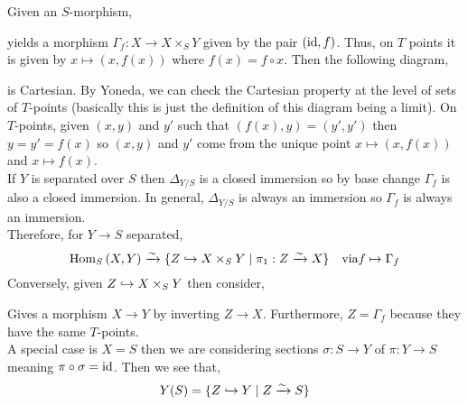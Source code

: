 \documentclass[12pt]{article}
\begin{document}
Given an $S$-morphism,
\begin{center}
\end{center}
yields a morphism $\Gamma_f : X \to X \times_S Y$ given by the pair $(\mathrm{id}, f)$. Thus, on $T$ points it is given by $x \mapsto (x, f(x))$ where $f(x) = f \circ x$. Then the following diagram,
\begin{center}
\end{center}
is Cartesian. By Yoneda, we can check the Cartesian property at the level of sets of $T$-points (basically this is just the definition of this diagram being a limit). On $T$-points, given $(x,y)$ and $y'$ such that $(f(x), y) = (y',y')$ then $y = y' = f(x)$ so $(x,y)$ and $y'$ come from the unique point $x \mapsto (x, f(x))$ and $x \mapsto f(x)$.
\bigskip\\
If $Y$ is separated over $S$ then $\Delta_{Y/S}$ is a closed immersion so by base change $\Gamma_f$ is also a closed immersion. In general, $\Delta_{Y/S}$ is always an immersion so $\Gamma_f$ is always an immersion. 
\bigskip\\
Therefore, for $Y \to S$ separated,
\[ \mathrm{Hom}_{S} \left( X, Y \right) \xrightarrow{\sim} \{ Z \hookrightarrow X \times_S Y \mid \pi_1 : Z \xrightarrow{\sim} X \} \quad \text{via} f \mapsto \Gamma_f \]
Conversely, given $Z \hookrightarrow X \times_S Y$ then consider,
\begin{center}
\end{center}
Gives a morphism $X \to Y$ by inverting $Z \to X$. Furthermore, $Z = \Gamma_f$ because they have the same $T$-points.
\bigskip\\
A special case is $X = S$ then we are considering sections $\sigma : S \to Y$ of $\pi : Y \to S$ meaning $\pi \circ \sigma = \mathrm{id}$. Then we see that,
\[ Y(S) = \{ Z \hookrightarrow Y \mid Z \xrightarrow{\sim} S \} \]
\end{document}
